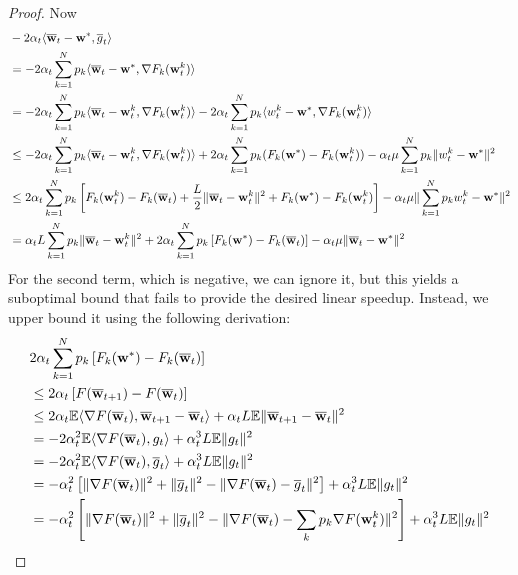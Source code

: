 \begin{proof}
	Now 
	\begin{align*}
	& -2\alpha_{t}\langle{\overline{\mathbf{w}}}_{t}-{\mathbf{w}}^{\ast},\overline{g}_{t}\rangle\\
	& =-2\alpha_{t}\sum_{k=1}^{N}p_{k}\langle{\overline{\mathbf{w}}}_{t}-{\mathbf{w}}^{\ast},\nabla F_{k}({\mathbf{w}}_{t}^{k})\rangle\\
	& =-2\alpha_{t}\sum_{k=1}^{N}p_{k}\langle{\overline{\mathbf{w}}}_{t}-{\mathbf{w}}_{t}^{k},\nabla F_{k}({\mathbf{w}}_{t}^{k})\rangle-2\alpha_{t}\sum_{k=1}^{N}p_{k}\langle w_{t}^{k}-{\mathbf{w}}^{\ast},\nabla F_{k}({\mathbf{w}}_{t}^{k})\rangle\\
	& \leq-2\alpha_{t}\sum_{k=1}^{N}p_{k}\langle{\overline{\mathbf{w}}}_{t}-{\mathbf{w}}_{t}^{k},\nabla F_{k}({\mathbf{w}}_{t}^{k})\rangle+2\alpha_{t}\sum_{k=1}^{N}p_{k}(F_{k}({\mathbf{w}}^{\ast})-F_{k}({\mathbf{w}}_{t}^{k}))-\alpha_{t}\mu\sum_{k=1}^{N}p_{k}\|w_{t}^{k}-{\mathbf{w}}^{\ast}\|^{2}\\
	& \leq2\alpha_{t}\sum_{k=1}^{N}p_{k}\left[F_{k}({\mathbf{w}}_{t}^{k})-F_{k}({\overline{\mathbf{w}}}_{t})+\frac{L}{2}\|{\overline{\mathbf{w}}}_{t}-{\mathbf{w}}_{t}^{k}\|^{2}+F_{k}({\mathbf{w}}^{\ast})-F_{k}({\mathbf{w}}_{t}^{k})\right]-\alpha_{t}\mu\|\sum_{k=1}^{N}p_{k}w_{t}^{k}-{\mathbf{w}}^{\ast}\|^{2}\\
	& =\alpha_{t}L\sum_{k=1}^{N}p_{k}\|{\overline{\mathbf{w}}}_{t}-{\mathbf{w}}_{t}^{k}\|^{2}+2\alpha_{t}\sum_{k=1}^{N}p_{k}\left[F_{k}({\mathbf{w}}^{\ast})-F_{k}({\overline{\mathbf{w}}}_{t})\right]-\alpha_{t}\mu\|{\overline{\mathbf{w}}}_{t}-{\mathbf{w}}^{\ast}\|^{2}
	\end{align*}
	For the second term, which is negative, we can ignore it, but this
	yields a suboptimal bound that fails to provide the desired linear
	speedup. Instead, we upper bound it using the following derivation:
	\begin{align*}
	& 2\alpha_{t}\sum_{k=1}^{N}p_{k}\left[F_{k}(\vw^{\ast})-F_{k}(\ov{w}_{t})\right]\\
	& \leq2\alpha_{t}\left[F(\ov{w}_{t+1})-F(\ov{w}_{t})\right]\\
	& \leq2\alpha_{t}\mathbb{E}\langle\nabla F(\ov{w}_{t}),\ov{w}_{t+1}-\ov{w}_{t}\rangle+\alpha_{t}L\mathbb{E}\|\ov{w}_{t+1}-\ov{w}_{t}\|^{2}\\
	& =-2\alpha_{t}^{2}\mathbb{E}\langle\nabla F(\ov{w}_{t}),g_{t}\rangle+\alpha_{t}^{3}L\mathbb{E}\|g_{t}\|^{2}\\
	& =-2\alpha_{t}^{2}\mathbb{E}\langle\nabla F(\ov{w}_{t}),\overline{g}_{t}\rangle+\alpha_{t}^{3}L\mathbb{E}\|g_{t}\|^{2}\\
	& =-\alpha_{t}^{2}\left[\|\nabla F(\ov{w}_{t})\|^{2}+\|\overline{g}_{t}\|^{2}-\|\nabla F(\ov{w}_{t})-\overline{g}_{t}\|^{2}\right]+\alpha_{t}^{3}L\mathbb{E}\|g_{t}\|^{2}\\
	& =-\alpha_{t}^{2}\left[\|\nabla F(\ov{w}_{t})\|^{2}+\|\overline{g}_{t}\|^{2}-\|\nabla F(\ov{w}_{t})-\sum_{k}p_{k}\nabla F(\vw_{t}^{k})\|^{2}\right]+\alpha_{t}^{3}L\mathbb{E}\|g_{t}\|^{2}\\

\end{align*}
\end{proof}
